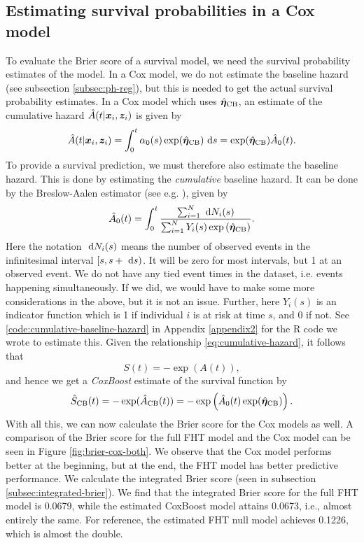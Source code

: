 \subsection{Estimating survival probabilities in a Cox model}
To evaluate the Brier score of a survival model, we need the survival probability estimates of the model.
In a Cox model, we do not estimate the baseline hazard (see subsection \ref{subsec:ph-reg}), but this is needed to get the actual survival probability estimates.
In a Cox model which uses $\hat{\boldsymbol{\eta}}_{\text{CB}}$, an estimate of the cumulative hazard $\hat{A}(t|\bm{x}_i,\bm{z}_i)$ is given by
\begin{equation*}
    \hat{A}(t|\bm{x}_i,\bm{z}_i)=\int_{0}^t \alpha_0(s)\exp(\hat{\boldsymbol{\eta}}_{\text{CB}})~\text{d} s=\exp(\hat{\boldsymbol{\eta}}_{\text{CB}})\hat{A}_0(t).
\end{equation*}
To provide a survival prediction, we must therefore also estimate the baseline hazard.
This is done by estimating the \textit{cumulative} baseline hazard.
It can be done by the Breslow-Aalen estimator (see e.g. \citet{ABG}), given by
\begin{equation}
    \hat{A}_0(t)=\int_{0}^t\frac{\sum_{i=1}^N ~\text{d} N_i(s)}{\sum_{i=1}^N Y_i(s)\exp \left(\hat{\boldsymbol{\eta}}_{\text{CB}} \right)}.
\end{equation}
Here the notation $~\text{d} N_i(s)$ means the number of observed events in the infinitesimal interval $[s,s+~\text{d} s)$.
It will be zero for most intervals, but 1 at an observed event.
We do not have any tied event times in the dataset, i.e. events happening simultaneously.
If we did, we would have to make some more considerations in the above, but it is not an issue.
Further, here $Y_i(s)$ is an indicator function which is 1 if individual $i$ is at risk at time $s$, and 0 if not. 
See \ref{code:cumulative-baseline-hazard} in Appendix \ref{appendix2} for the R code we wrote to estimate this.
Given the relationship \eqref{eq:cumulative-hazard}, it follows that
\begin{equation*}
    S(t)=-\exp(A(t)),
\end{equation*}
and hence we get a \textit{CoxBoost} estimate of the survival function by
\begin{equation*}
    \hat{S}_{\text{CB}}(t)=-\exp(\hat{A}_{\text{CB}}(t))=-\exp\left(\hat{A}_0(t)\exp(\hat{\boldsymbol{\eta}}_{\text{CB}})\right).
\end{equation*}
With all this, we can now calculate the Brier score for the Cox models as well.
A comparison of the Brier score for the full FHT model and the Cox model can be seen in Figure \ref{fig:brier-cox-both}.
We observe that the Cox model performs better at the beginning, but at the end, the FHT model has better predictive performance.
We calculate the integrated Brier score (seen in subsection \ref{subsec:integrated-brier}).
We find that the integrated Brier score for the full FHT model is 0.0679, while the estimated CoxBoost model attains 0.0673, i.e., almost entirely the same.
For reference, the estimated FHT null model achieves 0.1226, which is almost the double.


